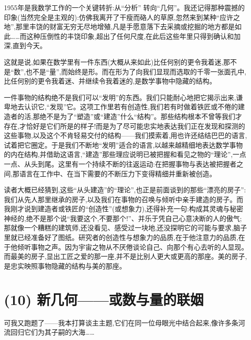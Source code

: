 1955年是我数学工作的一个关键转折:从“分析”
转向“几何”。我还记得那种震撼的印象(当然完全是主观的):仿佛我离开了干瘦而硌人的草原,忽然来到某种“应许之地”,那里丰饶的财富无穷无尽地增殖,凡是手愿意落下去采摘或挖掘的地方都是如此……而这种压倒性的丰饶印象,超出了任何尺度,在此后这些年里只得到确认和加深,直到今天。

这就是说,如果在数学里有一件东西(大概从来如此)比任何别的更令我着迷,那不是“数”,也不是“量”,而始终是形。而在形为了向我们显现而选取的千零一张面孔中,比任何别的更令我着迷、并继续令我着迷的,是数学事物中隐藏的结构。

一件事物的结构绝不是我们可以“发明”的东西。我们只能耐心地把它揭示出来,谦卑地去认识它,“发现”它。这项工作里若有创造性,我们若有时做着铁匠或不倦的建造者的活,那绝不是为了“塑造”或“建造”什么“结构”。那些结构根本不曾等我们才存在,才恰好是它们所是的样子!而是为了尽可能忠实地表达我们正在发现和探测的这些事物,以及这个不肯轻易交付的结构——我们摸索着,用也许还结结巴巴的语言,试着把它圈定。于是我们不断地“发明”适合的语言,以越来越精细地表达数学事物的内在结构,并借助这语言,“建造”那些理应说明已被把握和看见之物的“理论”,一点一点、从头到尾。这里有一个持续不断的往返运动:在把握事物与表达被把握者之间,那语言在工作中、在当下需要的不断压力下变得精细并重新被创造。

读者大概已经猜到,这些“从头建造”的“理论”,也正是前面谈到的那些“漂亮的房子”:我们从先人那里继承的房子,以及我们在事物的召唤与倾听中亲手建造的房子。而我刚才说到建造者或铁匠的“创造性”(或想象力),还得补充一句:构成其灵魂与秘密神经的,绝不是那个说“我要这个,不要那个!”、并乐于凭自己心意决断的人的傲气;那就像一个糟糕的建筑师,还没看见、感受过一块地,还没探明它的可能与要求,脑子里就已经准备好了图纸。研究者的创造性与想象力的品质,在于他注意力的品质,在于他倾听事物之声。因为宇宙之物从不厌倦谈论自己、向那个有心去听的人显现。而最美的房子,显出工匠之爱的那一座,并不是比别人更大或更高的那座。美的房子,是忠实映照事物隐藏的结构与美的那座。

\section{(10) 新几何——或数与量的联姻}

可我又跑题了——我本打算谈主主题,它们在同一位母眼光中结合起来,像许多条河流回归它们为其子嗣的大海……

